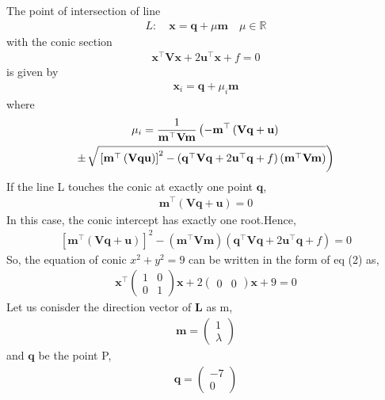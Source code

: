 \documentclass[journal,10pt,twocolumn]{article}
\providecommand{\sbrak}[1]{\ensuremath{{}\left[#1\right]}}
\providecommand{\brak}[1]{\ensuremath{\left(#1\right)}}
\providecommand{\lbrak}[1]{\ensuremath{\left(#1\right.}}
\providecommand{\rbrak}[1]{\ensuremath{\left.#1\right)}}
\let\vec\mathbf
\newcommand{\myvec}[1]{\ensuremath{\begin{pmatrix}#1\end{pmatrix}}}
\providecommand{\brak}[1]{\ensuremath{\left(#1\right)}}
\begin{document}
\large{The point of intersection of line}
\begin{align}
L: \quad \vec{x} = \vec{q} + \mu \vec{m} \quad \mu \in \mathbb{R}\end{align}
\large{with the conic section}
\begin{align}
\vec{x}^{\top}\vec{V}\vec{x}+2\vec{u}^{\top}\vec{x}+f=0
\end{align}
\large{is given by}
\begin{align}
\vec{x}_i = \vec{q} + \mu_i \vec{m}
\end{align}
\large{where}
\begin{multline}
\mu_i = \frac{1}{\vec{m}^{\top}\vec{V}\vec{m}}
\lbrak{-\vec{m}^{\top}\brak{\vec{V}\vec{q}+\vec{u}}}
\\
\pm{\small\rbrak{\sqrt{\sbrak{\vec{m}^{\top}\brak{\vec{V}\vec{q} \vec{u}}}^2-\brak{\vec{q}^{\top}\vec{V}\vec{q} + 2\vec{u}^{\top}\vec{q} +f}\brak{\vec{m}^{\top}\vec{V}\vec{m}}}}}
\end{multline}
\large{If the line L touches the conic at exactly one point $\vec{q}$,}
\begin{align}
\vec{m}^{\top}\brak{\vec{V}\vec{q}+\vec{u}} = 0
\end{align}
\large{In this case, the conic intercept has exactly one root.Hence,}
\begin{align}
\sbrak{\vec{m}^{\top}\brak{\vec{V}\vec{q}+\vec{u}}}^2 -\brak{\vec{m}^{\top}\vec{V}\vec{m}}\brak{\vec{q}^{\top}\vec{V}\vec{q} + 2\vec{u}^{\top}\vec{q} +f} = 0                                                                                             
\end{align}\vspace{0.5cm}
\large{So, the equation of conic  $x^2 + y^2 = 9$ can be written in the form of eq (2) as,}
\begin{align}
\vec{x}^{\top}\myvec{1&0\\0&1}\vec{x}+2\myvec{0&0}\vec{x}+9=0
\end{align}
\large{Let us conisder the direction vector of $\vec{L}$ as m,}
\begin{align}
\vec{m}=\myvec{1 \\ \lambda}
\end{align}
\large{and $\vec{q}$ be the point P,}
\begin{align}
\vec{q}=\myvec{-7 \\ 0}
\end{align}
\end{document}
